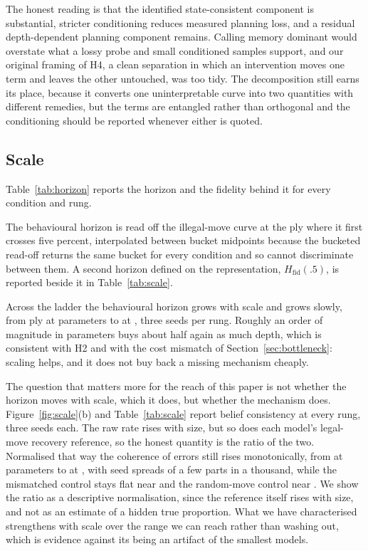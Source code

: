 \documentclass[11pt]{article}
\theoremstyle{remark}
\begin{document}
The honest reading is that the identified state-consistent component is
substantial, stricter conditioning reduces measured planning loss, and a residual
depth-dependent planning component remains. Calling memory dominant would
overstate what a lossy probe and small conditioned samples support, and our
original framing of H4, a clean separation in which an intervention moves one
term and leaves the other untouched, was too tidy. The decomposition still earns
its place, because it converts one uninterpretable curve into two quantities with
different remedies, but the terms are entangled rather than orthogonal and the
conditioning should be reported whenever either is quoted.

\subsection{Scale}
\label{sec:scale}

Table~\ref{tab:horizon} reports the horizon and the fidelity behind it for every
condition and rung.




The behavioural horizon is read off the illegal-move curve at the ply where it
first crosses five percent, interpolated between bucket midpoints because the
bucketed read-off returns the same bucket for every condition and so cannot
discriminate between them. A second horizon defined on the representation,
$H_{\mathrm{fid}}(.5)$, is reported beside it in Table~\ref{tab:scale}.

Across the ladder the behavioural horizon grows with scale and grows slowly,
from  ply at  parameters to
 at , three seeds per rung. Roughly an
order of magnitude in parameters buys about half again as much depth, which
is consistent with H2 and with the cost mismatch of Section~\ref{sec:bottleneck}:
scaling helps, and it does not buy back a missing mechanism cheaply.

The question that matters more for the reach of this paper is not whether the
horizon moves with scale, which it does, but whether the mechanism does.
Figure~\ref{fig:scale}(b) and Table~\ref{tab:scale} report belief consistency at
every rung, three seeds each. The raw rate rises with size, but so does each
model's legal-move recovery reference, so the honest quantity is the ratio of the two.
Normalised that way the coherence of errors still rises monotonically, from
 at  parameters to
 at , with seed spreads of a few parts
in a thousand, while the mismatched control stays flat near
 and the random-move control near . We show
the ratio as a descriptive normalisation, since the reference itself rises with
size, and not as an estimate of a hidden true proportion. What we have characterised strengthens with scale over
the range we can reach rather than washing out, which is evidence against its
being an artifact of the smallest models.
\end{document}
